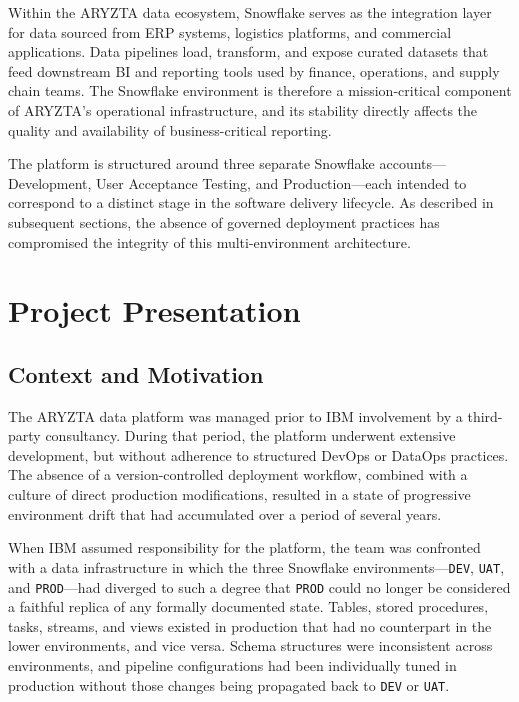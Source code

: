 Within the ARYZTA data ecosystem, Snowflake serves as the integration layer for data sourced from ERP systems, logistics platforms, and commercial applications. Data pipelines load, transform, and expose curated datasets that feed downstream BI and reporting tools used by finance, operations, and supply chain teams. The Snowflake environment is therefore a mission-critical component of ARYZTA's operational infrastructure, and its stability directly affects the quality and availability of business-critical reporting.

The platform is structured around three separate Snowflake accounts---Development, User Acceptance Testing, and Production---each intended to correspond to a distinct stage in the software delivery lifecycle. As described in subsequent sections, the absence of governed deployment practices has compromised the integrity of this multi-environment architecture.

\section{Project Presentation}
\label{sec:project-presentation}

\subsection{Context and Motivation}
\label{subsec:context-motivation}

The ARYZTA data platform was managed prior to IBM involvement by a third-party consultancy. During that period, the platform underwent extensive development, but without adherence to structured DevOps or DataOps practices. The absence of a version-controlled deployment workflow, combined with a culture of direct production modifications, resulted in a state of progressive environment drift that had accumulated over a period of several years.

When IBM assumed responsibility for the platform, the team was confronted with a data infrastructure in which the three Snowflake environments---\texttt{DEV}, \texttt{UAT}, and \texttt{PROD}---had diverged to such a degree that \texttt{PROD} could no longer be considered a faithful replica of any formally documented state. Tables, stored procedures, tasks, streams, and views existed in production that had no counterpart in the lower environments, and vice versa. Schema structures were inconsistent across environments, and pipeline configurations had been individually tuned in production without those changes being propagated back to \texttt{DEV} or \texttt{UAT}.

